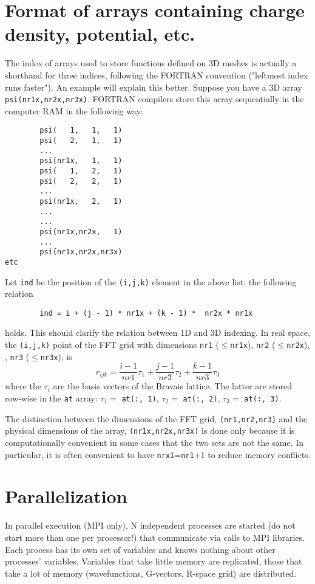 \documentclass[12pt,a4paper]{article}
\begin{document}
\section{Format of arrays containing charge density, potential, etc.}
The index of arrays used to store functions defined on 3D meshes is
actually a shorthand for three indices, following the FORTRAN convention
("leftmost index runs faster"). An example will explain this better.
Suppose you have a 3D array \texttt{psi(nr1x,nr2x,nr3x)}. FORTRAN
compilers store this array sequentially  in the computer RAM in the following way:
\begin{verbatim}
        psi(   1,   1,   1)
        psi(   2,   1,   1)
        ...
        psi(nr1x,   1,   1)
        psi(   1,   2,   1)
        psi(   2,   2,   1)
        ...
        psi(nr1x,   2,   1)
        ...
        ...
        psi(nr1x,nr2x,   1)
        ...
        psi(nr1x,nr2x,nr3x)
etc
\end{verbatim}
Let \texttt{ind} be the position of the \texttt{(i,j,k)} element in the above list:
the following relation
\begin{verbatim}
        ind = i + (j - 1) * nr1x + (k - 1) *  nr2x * nr1x
\end{verbatim}
holds. This should clarify the relation between 1D and 3D indexing. In real
space, the \texttt{(i,j,k)} point of the FFT grid with dimensions
\texttt{nr1} ($\le$\texttt{nr1x}),
\texttt{nr2}  ($\le$\texttt{nr2x}), , \texttt{nr3} ($\le$\texttt{nr3x}), is
$$
r_{ijk}=\frac{i-1}{nr1} \tau_1  +  \frac{j-1}{nr2} \tau_2 +
\frac{k-1}{nr3} \tau_3
$$
where the $\tau_i$ are the basis vectors of the Bravais lattice.
The latter are stored row-wise in the \texttt{at} array:
$\tau_1 = $ \texttt{at(:, 1)},
$\tau_2 = $ \texttt{at(:, 2)},
$\tau_3 = $ \texttt{at(:, 3)}.

The distinction between the dimensions of the FFT grid,
\texttt{(nr1,nr2,nr3)} and the physical dimensions of the array,
\texttt{(nr1x,nr2x,nr3x)} is done only because it is computationally
convenient in some cases that the two sets are not the same.
In particular, it is often convenient to have \texttt{nrx1}=\texttt{nr1}+1
to reduce memory conflicts.

\section{Parallelization}

In parallel execution (MPI only), N independent processes are started
(do not start more than one per processor!) that communicate via calls
to MPI libraries. Each process has its own set of variables and knows
nothing about other processes' variables. Variables that take little memory 
are replicated, those that take a lot of memory (wavefunctions, G-vectors, 
R-space grid) are distributed.
    
\end{document}
